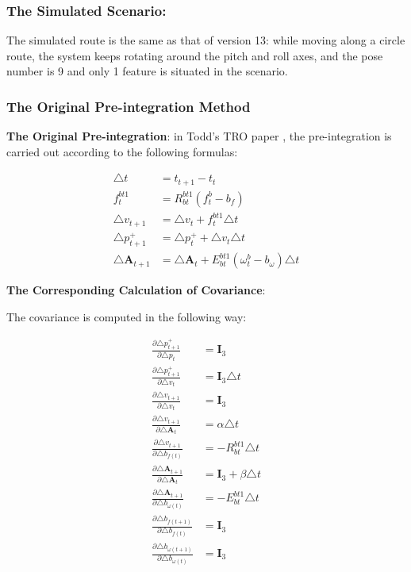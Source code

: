 \documentclass[12pt]{article}   %
\begin{document}
\subsubsection{The Simulated Scenario:}

The simulated route is the same as that of version 13: while moving along a circle route, the system keeps rotating around the pitch and roll axes, and the pose number is 9 and only 1 feature is situated in the scenario.

\subsubsection{The Original Pre-integration Method}

\textbf{The Original Pre-integration}: in Todd's TRO paper \cite{Lupton2012}, the pre-integration is carried out according to the following formulas:

\begin{align*}
\triangle t & =  t_{t+1} - t_t \\
f_t^{bt1} & = R_{bt}^{bt1} (f_t^b - b_f) \\
\triangle v_{t+1} & = \triangle v_{t} + f_t^{bt1} \triangle t \\
\triangle p_{t+1}^+ & = \triangle p_{t}^+ + \triangle v_t \triangle t \\
\triangle \textbf{A} _{t+1} & = \triangle \textbf{A} _{t} + E_{bt}^{bt1} (\omega _t^b - b_\omega) \triangle t
\end{align*}

\noindent\textbf{The Corresponding Calculation of Covariance}: 

The covariance is computed in the following way:

\begin{align*}
\frac{\partial \triangle p_{t+1}^+} {\partial \triangle p_{t}} & =  \textbf{I}_3 \\
\frac{\partial \triangle p_{t+1}^+} {\partial \triangle v_{t}} & =  \textbf{I}_3 \triangle t \\
\frac{\partial \triangle v_{t+1}} {\partial \triangle v_{t}} & =  \textbf{I}_3 \\
\frac{\partial \triangle v_{t+1}} {\partial \triangle \textbf{A} _{t}} & =  \alpha \triangle t \\
\frac{\partial \triangle v_{t+1}} {\partial \triangle b_{f(t)}} & =  -R_{bt}^{bt1} \triangle t \\
\frac{\partial \triangle \textbf{A} _{t+1}} {\partial \triangle \textbf{A} _{t}} & =  \textbf{I}_3 + \beta \triangle t \\
\frac{\partial \triangle \textbf{A} _{t+1}} {\partial \triangle b_{\omega (t)}} & =  -E_{bt}^{bt1} \triangle t \\
\frac{\partial \triangle b_{f(t+1)}} {\partial \triangle b_{f(t)}} & =  \textbf{I}_3 \\
\frac{\partial \triangle b_{\omega (t+1)}} {\partial \triangle b_{\omega (t)}} & =  \textbf{I}_3 
\end{align*}
\end{document}
